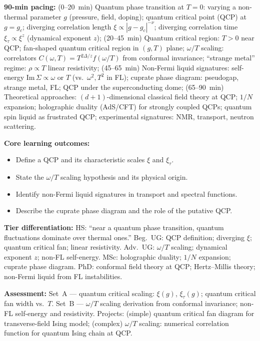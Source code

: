 \documentclass[11pt,a4paper]{article}
\begin{document}
\medskip

\begin{tcolorbox}[modulebox, title={Module~II.7 --- Lecture L10: Quantum Criticality}]
\textbf{90-min pacing:} (0--20~min) Quantum phase transition at $T=0$: varying a non-thermal parameter $g$ (pressure, field, doping); quantum critical point (QCP) at $g=g_c$; diverging correlation length $\xi\propto|g-g_c|^{-\nu}$; diverging correlation time $\xi_\tau\propto\xi^z$ (dynamical exponent $z$); (20--45~min) Quantum critical region: $T>0$ near QCP; fan-shaped quantum critical region in $(g,T)$ plane; $\omega/T$ scaling: correlators $C(\omega,T)=T^{2\Delta/z}f(\omega/T)$ from conformal invariance; ``strange metal'' regime: $\rho\propto T$ linear resistivity; (45--65~min) Non-Fermi liquid signatures: self-energy Im$\,\Sigma\propto\omega$ or $T$ (vs.\ $\omega^2,T^2$ in FL); cuprate phase diagram: pseudogap, strange metal, FL; QCP under the superconducting dome; (65--90~min) Theoretical approaches: $(d+1)$-dimensional classical field theory at QCP; $1/N$ expansion; holographic duality (AdS/CFT) for strongly coupled QCPs; quantum spin liquid as frustrated QCP; experimental signatures: NMR, transport, neutron scattering.

\medskip\textbf{Core learning outcomes:}
\begin{itemize}[leftmargin=1.4em,topsep=2pt,itemsep=1pt]
  \item Define a QCP and its characteristic scales $\xi$ and $\xi_\tau$.
  \item State the $\omega/T$ scaling hypothesis and its physical origin.
  \item Identify non-Fermi liquid signatures in transport and spectral functions.
  \item Describe the cuprate phase diagram and the role of the putative QCP.
\end{itemize}

\medskip\textbf{Tier differentiation:}
HS: ``near a quantum phase transition, quantum fluctuations dominate over thermal ones.''
Beg.\ UG: QCP definition; diverging $\xi$; quantum critical fan; linear resistivity.
Adv.\ UG: $\omega/T$ scaling; dynamical exponent $z$; non-FL self-energy.
MSc: holographic duality; $1/N$ expansion; cuprate phase diagram.
PhD: conformal field theory at QCP; Hertz--Millis theory; non-Fermi liquid from FL instabilities.

\medskip\textbf{Assessment:}
Set~A --- quantum critical scaling: $\xi(g)$, $\xi_\tau(g)$; quantum critical fan width vs.\ $T$.
Set~B --- $\omega/T$ scaling derivation from conformal invariance; non-FL self-energy and resistivity.
Projects: (simple) quantum critical fan diagram for transverse-field Ising model;
(complex) $\omega/T$ scaling: numerical correlation function for quantum Ising chain at QCP.
\end{tcolorbox}
\end{document}

